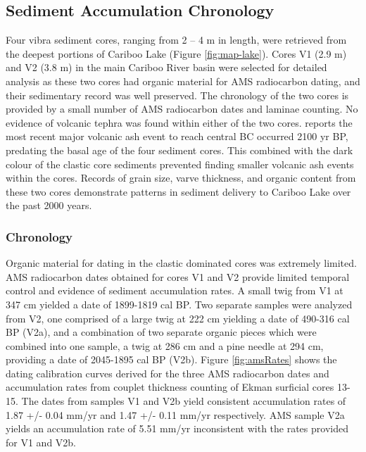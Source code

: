\documentclass[Royal,times,doublespace,sageh]{sagej}
\begin{document}
\hypertarget{sediment-accumulation-chronology}{%
\subsection{Sediment Accumulation
Chronology}\label{sediment-accumulation-chronology}}

Four vibra sediment cores, ranging from 2 -- 4 m in length, were
retrieved from the deepest portions of Cariboo Lake (Figure
\ref{fig:map-lake}). Cores V1 (2.9 m) and V2 (3.8 m) in the main Cariboo
River basin were selected for detailed analysis as these two cores had
organic material for AMS radiocarbon dating, and their sedimentary
record was well preserved. The chronology of the two cores is provided
by a small number of AMS radiocarbon dates and laminae counting. No
evidence of volcanic tephra was found within either of the two cores.
\citet{Westgate1977} reports the most recent major volcanic ash event to
reach central BC occurred 2100 yr BP, predating the basal age of the
four sediment cores. This combined with the dark colour of the clastic
core sediments prevented finding smaller volcanic ash events within the
cores. Records of grain size, varve thickness, and organic content from
these two cores demonstrate patterns in sediment delivery to Cariboo
Lake over the past 2000 years.

\hypertarget{chronology}{%
\subsubsection{Chronology}\label{chronology}}

Organic material for dating in the clastic dominated cores was extremely
limited. AMS radiocarbon dates obtained for cores V1 and V2 provide
limited temporal control and evidence of sediment accumulation rates. A
small twig from V1 at 347 cm yielded a date of 1899-1819 cal BP. Two
separate samples were analyzed from V2, one comprised of a large twig at
222 cm yielding a date of 490-316 cal BP (V2a), and a combination of two
separate organic pieces which were combined into one sample, a twig at
286 cm and a pine needle at 294 cm, providing a date of 2045-1895 cal BP
(V2b). Figure \ref{fig:amsRates} shows the dating calibration curves
derived for the three AMS radiocarbon dates and accumulation rates from
couplet thickness counting of Ekman surficial cores 13-15. The dates
from samples V1 and V2b yield consistent accumulation rates of 1.87 +/-
0.04 mm/yr and 1.47 +/- 0.11 mm/yr respectively. AMS sample V2a yields
an accumulation rate of 5.51 mm/yr inconsistent with the rates provided
for V1 and V2b.
\end{document}
